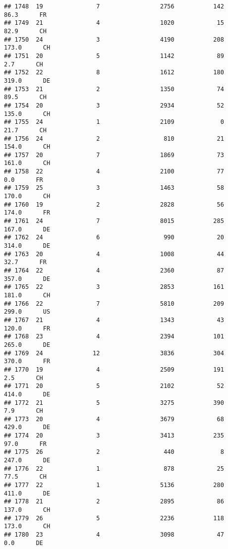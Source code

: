 \documentclass[
]{article}
\begin{document}
\begin{verbatim}
## 1748  19               7                 2756           142     86.3      FR
## 1749  21               4                 1020            15     82.9      CH
## 1750  24               3                 4190           208    173.0      CH
## 1751  20               5                 1142            89      2.7      CH
## 1752  22               8                 1612           180    319.0      DE
## 1753  21               2                 1350            74     89.5      CH
## 1754  20               3                 2934            52    135.0      CH
## 1755  24               1                 2109             0     21.7      CH
## 1756  24               2                  810            21    154.0      CH
## 1757  20               7                 1869            73    161.0      CH
## 1758  22               4                 2100            77      0.0      FR
## 1759  25               3                 1463            58    170.0      CH
## 1760  19               2                 2828            56    174.0      FR
## 1761  24               7                 8015           285    167.0      DE
## 1762  24               6                  990            20    314.0      DE
## 1763  20               4                 1008            44     32.7      FR
## 1764  22               4                 2360            87    357.0      DE
## 1765  22               3                 2853           161    181.0      CH
## 1766  22               7                 5810           209    299.0      US
## 1767  21               4                 1343            43    120.0      FR
## 1768  23               4                 2394           101    265.0      DE
## 1769  24              12                 3836           304    370.0      FR
## 1770  19               4                 2509           191      2.5      CH
## 1771  20               5                 2102            52    414.0      DE
## 1772  21               5                 3275           390      7.9      CH
## 1773  20               4                 3679            68    429.0      DE
## 1774  20               3                 3413           235     97.0      FR
## 1775  26               2                  440             8    247.0      DE
## 1776  22               1                  878            25     77.5      CH
## 1777  22               1                 5136           280    411.0      DE
## 1778  21               2                 2895            86    137.0      CH
## 1779  26               5                 2236           118    173.0      CH
## 1780  23               4                 3098            47      0.0      DE

\end{verbatim}
\end{document}
